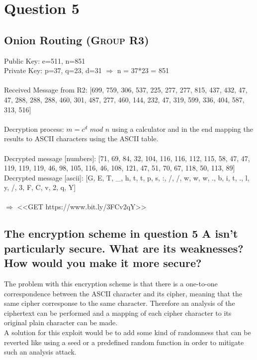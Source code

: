 \documentclass{report}
\begin{document}
	\section{Question 5}
	\startsection
		\renewcommand{\thesubsection}{\thesection.\Alph{subsection}}
		\subsection{Onion Routing (\textsc{Group} R3)}
		\startsubsection
			Public Key: e=511, n=851 \\
			Private Key: p=37, q=23, d=31 $\Rightarrow$ n = 37*23 = 851 \\ \\
			Received Message from R2: [699, 759, 306, 537, 225, 277, 277, 815, 437, 432, 47, 47, 288, 288, 288, 460, 301, 487, 277, 460, 144, 232, 47, 319, 599, 336, 404, 587, 313, 516] \\ \\
			Decryption process: $m = c^d \textit{ mod } n$ using a calculator and in the end mapping the results to ASCII characters using the ASCII table. \\ \\
			\noindent Decrypted message [numbers]: [71, 69, 84, 32, 104, 116, 116, 112, 115, 58, 47, 47, 119, 119, 119, 46, 98, 105, 116, 46, 108, 121, 47, 51, 70, 67, 118, 50, 113, 89] \\
			Decrypted message [ascii]: [G, E, T, \_, h, t, t, p, s, :, /, /, w, w, w, ., b, i, t, ., l, y, /, 3, F, C, v, 2, q, Y] \\
			\\
			$\Rightarrow$ <<GET https://www.bit.ly/3FCv2qY>>
		\closesection
		\subsection{The encryption scheme in question 5 A isn’t particularly secure. What are its weaknesses? How would you make it more secure?}
		\startsubsection
			The problem with this encryption scheme is that there is a one-to-one correspondence between the ASCII character and its cipher, meaning that the same cipher corresponse to the same character. Therefore an analysis of the ciphertext can be performed and a mapping of each cipher character to its original plain character can be made. \\
			A solution for this exploit would be to add some kind of randomness that can be reverted like using a seed or a predefined random function in order to mitigate such an analysis attack.
		\closesection
	\closesection
\end{document}
